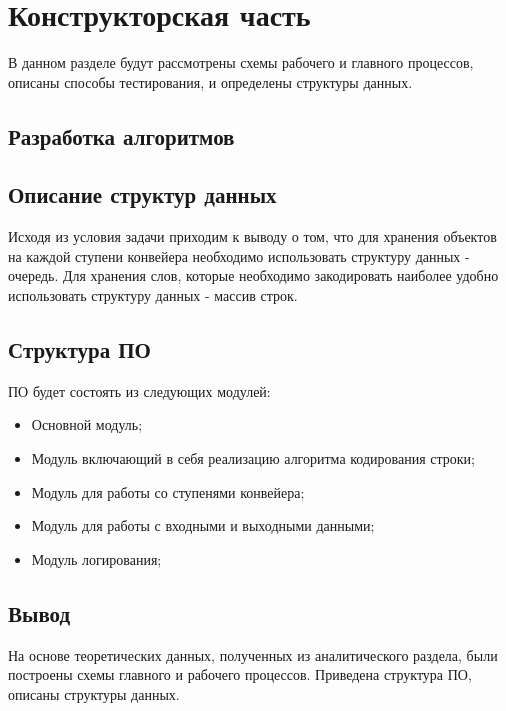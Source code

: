 \chapter{Конструкторская часть}
В данном разделе будут рассмотрены схемы рабочего и главного процессов, описаны способы тестирования, и определены структуры данных. 
\section{Разработка алгоритмов}



\clearpage
{}


\section{Описание структур данных}
Исходя из условия задачи приходим к выводу о том, что для хранения объектов на каждой ступени конвейера необходимо использовать структуру данных - очередь. Для хранения слов, которые необходимо закодировать наиболее удобно использовать структуру данных - массив строк.
  

\section{Структура ПО}
ПО будет состоять из следующих модулей:

\begin{itemize}
    \item Основной модуль;
    \item Модуль включающий в себя реализацию алгоритма кодирования строки;
    \item Модуль для работы со ступенями конвейера;
    \item Модуль для работы с входными и выходными данными;
    \item Модуль логирования;
\end{itemize}

\section*{Вывод}

На основе теоретических данных, полученных из аналитического раздела, были построены схемы главного и рабочего процессов. Приведена структура ПО, описаны структуры данных.